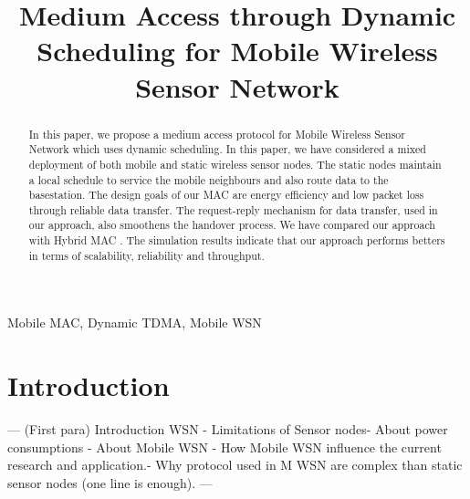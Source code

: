 \documentclass[a4paper, conference, 10pt]{IEEEtran}
\begin{document}
%
\title{Medium Access through Dynamic Scheduling for Mobile Wireless Sensor Network}



\author{
}

\maketitle

\begin{abstract}
	In this paper, we propose a medium access protocol for Mobile Wireless Sensor Network which uses dynamic scheduling. In this paper, we have considered a mixed deployment of both mobile and static wireless sensor nodes. The static nodes maintain a local schedule to service the mobile neighbours and also route data to the basestation. The design goals of our MAC are energy efficiency and low packet loss through reliable data transfer. The request-reply mechanism for data transfer, used in our approach, also smoothens the handover process. We have compared our approach with Hybrid MAC \cite{hmac}. The simulation results indicate that our approach performs betters in terms of scalability, reliability and throughput.%

\end{abstract}

\begin{keywords}
Mobile MAC, Dynamic TDMA, Mobile WSN
\end{keywords}

\IEEEpeerreviewmaketitle

\section{Introduction}
\label{intro}
--- (First para) Introduction  WSN - Limitations of Sensor nodes- About power consumptions - About Mobile WSN - How Mobile WSN influence the current research and application.- Why protocol used in M WSN are complex than static sensor nodes (one line is enough). ---\\ \\
\end{document}
